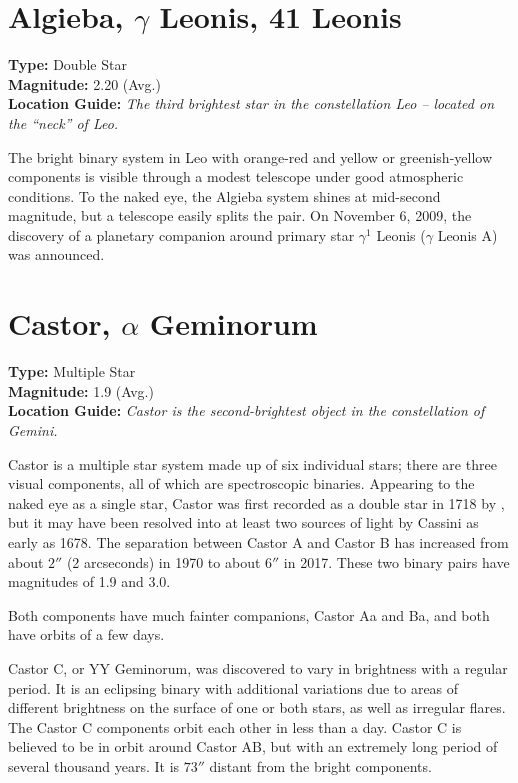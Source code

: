 \section{Algieba, \texorpdfstring{$\gamma$}{gamma} Leonis, 41 Leonis}
\textbf{Type:} Double Star \\
\textbf{Magnitude:} 2.20 (Avg.) \\
\textbf{Location Guide:} \textit{The third brightest star in the constellation Leo -- located on the ``neck'' of Leo.}

The bright binary system in Leo with orange-red and yellow or greenish-yellow components is visible through a modest telescope under good atmospheric conditions.
To the naked eye, the Algieba system shines at mid-second magnitude, but a telescope easily splits the pair.
On November 6, 2009, the discovery of a planetary companion around primary star $\gamma^1$ Leonis ($\gamma$ Leonis A) was announced.

\section{Castor, \texorpdfstring{$\alpha$}{alpha} Geminorum}
\textbf{Type:} Multiple Star \\
\textbf{Magnitude:} 1.9 (Avg.) \\
\textbf{Location Guide:} \textit{Castor is the second-brightest object in the constellation of Gemini.}

Castor is a multiple star system made up of six individual stars;
there are three visual components, all of which are spectroscopic binaries.
Appearing to the naked eye as a single star, Castor was first recorded as a double star in 1718 by ,
but it may have been resolved into at least two sources of light by Cassini as early as 1678.
The separation between Castor A and Castor B has increased from about $2''$ (2 arcseconds) in 1970 to about $6''$ in 2017.
These two binary pairs have magnitudes of 1.9 and 3.0.

Both components have much fainter companions, Castor Aa and Ba, and both have orbits of a few days.

Castor C, or YY Geminorum, was discovered to vary in brightness with a regular period.
It is an eclipsing binary with additional variations due to areas of different brightness on the surface of one or both stars,
as well as irregular flares. The Castor C components orbit each other in less than a day.
Castor C is believed to be in orbit around Castor AB, but with an extremely long period of several thousand years.
It is $73''$ distant from the bright components.

